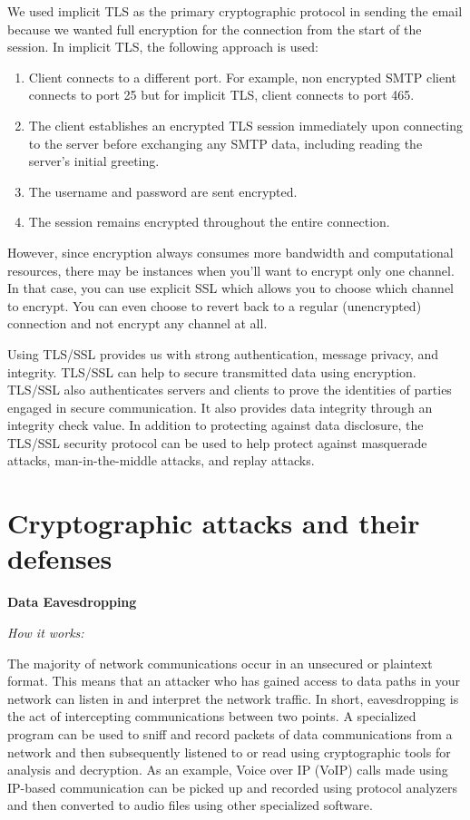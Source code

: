 \documentclass[a4paper,twoside,10pt]{report}
\begin{document}
We used implicit TLS as the primary cryptographic protocol in sending the email because we wanted full encryption for the connection from the start of the session. In implicit TLS, the following approach is used:
\begin{enumerate}
	\item Client connects to a different port. For example, non encrypted SMTP client connects to port 25 but for implicit TLS, client connects to port 465.
	\item The client establishes an encrypted TLS session immediately upon connecting to the server before exchanging any SMTP data, including reading the server's initial greeting. 
	\item The username and password are sent encrypted.
	\item The session remains encrypted throughout the entire connection.
\end{enumerate}

However, since encryption always consumes more bandwidth and computational resources, there may be instances when you'll want to encrypt only one channel. In that case, you can use explicit SSL which allows you to choose which channel to encrypt.  You can even choose to revert back to a regular (unencrypted) connection and not encrypt any channel at all.

\vspace{2.5mm}

Using TLS/SSL provides us with strong authentication, message privacy, and integrity. TLS/SSL can help to secure transmitted data using encryption. TLS/SSL also authenticates servers and clients to prove the identities of parties engaged in secure communication. It also provides data integrity through an integrity check value. In addition to protecting against data disclosure, the TLS/SSL security protocol can be used to help protect against masquerade attacks, man-in-the-middle attacks, and replay attacks.

\noindent
\section{Cryptographic attacks and their defenses}\label{approach}

\noindent
{\large\textbf{Data Eavesdropping}}

\vspace{1mm}
\noindent
\textit{How it works: }

The majority of network communications occur in an unsecured or plaintext format. This means that an attacker who has gained access to data paths in your network can listen in and interpret the network traffic. In short, eavesdropping is the act of intercepting communications between two points. A specialized program can be used to sniff and record packets of data communications from a network and then subsequently listened to or read using cryptographic tools for analysis and decryption. As an example, Voice over IP (VoIP) calls made using IP-based communication can be picked up and recorded using protocol analyzers and then converted to audio files using other specialized software.
\end{document}
